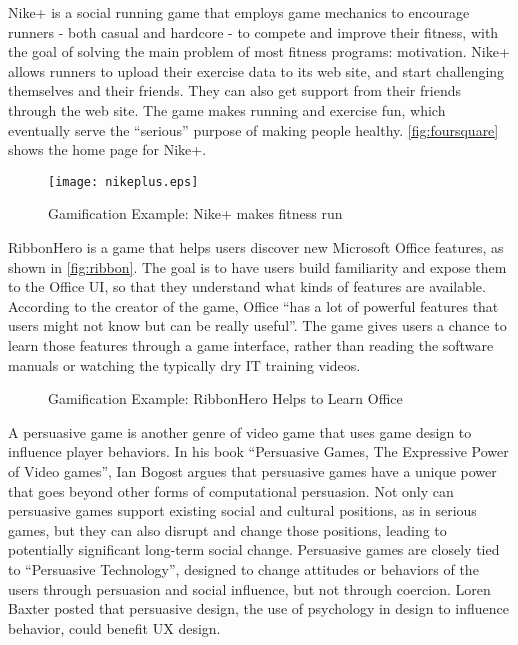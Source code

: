 Nike+ \cite{nikeplus} is a social running game that employs game mechanics to encourage runners - both casual and hardcore - to compete and improve their fitness, with the goal of solving the main problem of most fitness programs: motivation. Nike+ allows runners to upload their exercise data to its web site, and start challenging themselves and their friends. They can also get support from their friends through the web site. The game makes running and exercise fun, which eventually serve the ``serious'' purpose of making people healthy. \autoref{fig:foursquare} shows the home page for Nike+.

\begin{figure}[ht!]
	\centering
		\texttt{[image: nikeplus.eps]}
		\caption{Gamification Example: Nike+ makes fitness run\cite{nikeplus}}
		\label{fig:nikeplus}
\end{figure}

RibbonHero \cite{ribbonhero} is a game that helps users discover new Microsoft Office features, as shown in \autoref{fig:ribbon}. The goal is to have users build familiarity and expose them to the Office UI, so that they understand what kinds of features are available. According to the creator of the game, Office ``has a lot of powerful features that users might not know but can be really useful''. The game gives users a chance to learn those features through a game interface, rather than reading the software manuals or watching the typically dry IT training videos.

\begin{figure}[ht!]
	\centering
		\caption{Gamification Example: RibbonHero Helps to Learn Office\cite{ribbonhero}}
		\label{fig:ribbon}
\end{figure}

A persuasive game is another genre of video game that uses game design to influence player behaviors. In his book ``Persuasive Games, The Expressive Power of Video games'', Ian Bogost\cite{bogost2007persuasive} argues that persuasive games have a unique power that goes beyond other forms of computational persuasion. Not only can
persuasive games support existing social and cultural positions, as in serious games, but they can also
disrupt and change those positions, leading to potentially significant long-term social change. Persuasive games are closely tied to ``Persuasive Technology''\cite{fogg_2003}, designed to change attitudes or behaviors of the users through persuasion and social influence, but not through coercion. Loren Baxter\cite{baxter_2011} posted that persuasive design, the use of psychology in design to influence behavior, could benefit UX design.

